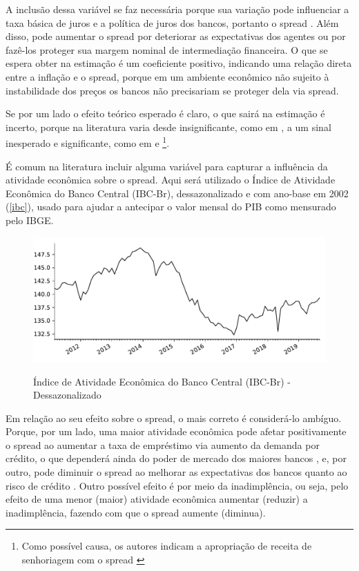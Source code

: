 \documentclass[a4paper,
               article,
               12pt,
               openany,
               oneside,
               english,
               brazil]{abntex2}
\numberwithin{equation}{section}
\begin{document}
    A inclusão dessa variável se faz necessária porque sua variação pode influenciar a taxa básica de juros e a política de juros dos bancos, portanto o spread \cite[p.~14]{bignotto06}. Além disso, pode aumentar o spread por deteriorar as expectativas dos agentes ou por fazê-los proteger sua margem nominal de intermediação financeira. O que se espera obter na estimação é um coeficiente positivo, indicando uma relação direta entre a inflação e o spread, porque em um ambiente econômico não sujeito à instabilidade dos preços os bancos não precisariam se proteger dela via spread. 
    
    Se por um lado o efeito teórico esperado é claro, o que sairá na estimação é incerto, porque na literatura varia desde insignificante, como em \textcite{oreiro}, a um sinal inesperado e significante, como em \textcite{bignotto06} e \textcite{afanasieff02}\footnote{Como possível causa, os autores indicam a apropriação de receita de senhoriagem com o spread \cite[p.~25]{afanasieff02}}.
    
    É comum na literatura incluir alguma variável para capturar a influência da atividade econômica sobre o spread. Aqui será utilizado o Índice de Atividade Econômica do Banco Central (IBC-Br), dessazonalizado e com ano-base em 2002 (\autoref{ibc}), usado para ajudar a antecipar o valor mensal do PIB como mensurado pelo IBGE.

    \begin{figure}[!hbt]
        \centering
        \caption{Índice de Atividade Econômica do Banco Central (IBC-Br) - Dessazonalizado}
        \includegraphics[width = \textwidth, scale=0.75]{ibc.pdf}
        \label{ibc}
    \end{figure}

    Em relação ao seu efeito sobre o spread, o mais correto é considerá-lo ambíguo. Porque, por um lado, uma maior atividade econômica pode afetar positivamente o spread ao aumentar a taxa de empréstimo via aumento da demanda por crédito, o que dependerá ainda do poder de mercado dos maiores bancos \textcite[626]{oreiro}, e, por outro, pode diminuir o spread ao melhorar as expectativas dos bancos quanto ao risco de crédito \textcite[24]{chaim}. Outro possível efeito é por meio da inadimplência, ou seja, pelo efeito de uma menor (maior) atividade econômica aumentar (reduzir) a inadimplência, fazendo com que o spread aumente (diminua).
\end{document}
